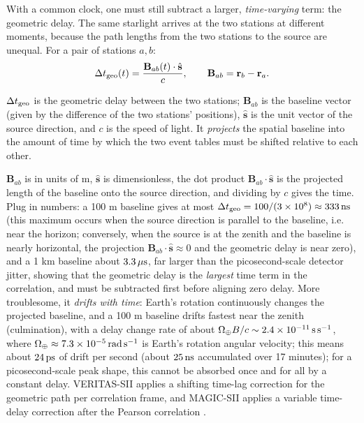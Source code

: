 With a common clock, one must still subtract a larger, \emph{time-varying} term: the geometric delay. The same starlight arrives at the two stations at different moments, because the path lengths from the two stations to the source are unequal. For a pair of stations $a,b$:
\begin{equation}
  \Delta t_{\rm geo}(t)
  =
  \frac{\mathbf{B}_{ab}(t)\cdot\hat{\mathbf{s}}}{c},
  \qquad
  \mathbf{B}_{ab}=\mathbf{r}_b-\mathbf{r}_a .
  \label{eq:e13-geometric-delay}
\end{equation}
\begin{formulaexplain}
$\Delta t_{\rm geo}$ is the geometric delay between the two stations; $\mathbf B_{ab}$ is the baseline vector (given by the difference of the two stations' positions), $\hat{\mathbf s}$ is the unit vector of the source direction, and $c$ is the speed of light. It \emph{projects} the spatial baseline into the amount of time by which the two event tables must be shifted relative to each other.
\end{formulaexplain}
$\mathbf B_{ab}$ is in units of m, $\hat{\mathbf s}$ is dimensionless, the dot product $\mathbf B_{ab}\cdot\hat{\mathbf s}$ is the projected length of the baseline onto the source direction, and dividing by $c$ gives the time. Plug in numbers: a 100 m baseline gives at most $\Delta t_{\rm geo}=100/(3\times10^8)\approx333\,{\rm ns}$ (this maximum occurs when the source direction is parallel to the baseline, i.e. near the horizon; conversely, when the source is at the zenith and the baseline is nearly horizontal, the projection $\mathbf B_{ab}\cdot\hat{\mathbf s}\approx0$ and the geometric delay is near zero), and a 1 km baseline about $3.3\,\mu{\rm s}$, far larger than the picosecond-scale detector jitter, showing that the geometric delay is the \emph{largest} time term in the correlation, and must be subtracted first before aligning zero delay. More troublesome, it \emph{drifts with time}: Earth's rotation continuously changes the projected baseline, and a 100 m baseline drifts fastest near the zenith (culmination), with a delay change rate of about $\Omega_\oplus B/c\sim2.4\times10^{-11}\,{\rm s\,s^{-1}}$, where $\Omega_\oplus\approx7.3\times10^{-5}\,{\rm rad\,s^{-1}}$ is Earth's rotation angular velocity; this means about $24\,{\rm ps}$ of drift per second (about $25\,{\rm ns}$ accumulated over 17 minutes); for a picosecond-scale peak shape, this cannot be absorbed once and for all by a constant delay. VERITAS-SII applies a shifting time-lag correction for the geometric path per correlation frame, and MAGIC-SII applies a variable time-delay correction after the Pearson correlation \citep{2020NatAs...4.1164A,2024MNRAS.529.4387A}.

